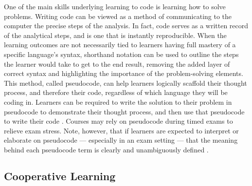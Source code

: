 One of the main skills underlying learning to code is learning how to solve problems. 
Writing code can be viewed as a method of communicating to the computer the precise steps of the analysis.
In fact, code serves as a written record of the analytical steps, and is one that is instantly reproducible.
When the learning outcomes are not necessarily tied to learners having full mastery of a specific language's syntax, shorthand notation can be used to outline the steps the learner would take to get to the end result, removing the added layer of correct syntax and highlighting the importance of the problem-solving elements.
This method, called pseudocode, can help learners logically scaffold their thought process, and therefore their code, regardless of which language they will be coding in.
Learners can be required to write the solution to their problem in pseudocode to demonstrate their thought process, and then use that pseudocode to write their code \citep[e.g.,][]{olsen_using_2005}.
Courses may rely on pseudocode during timed exams to relieve exam stress.
Note, however, that if learners are expected to interpret or elaborate on pseudocode --- especially in an exam setting --- that the 
meaning behind each pseudocode term is clearly and unambiguously defined \citep{cutts_code_2014}.

\subsection{Cooperative Learning} 

